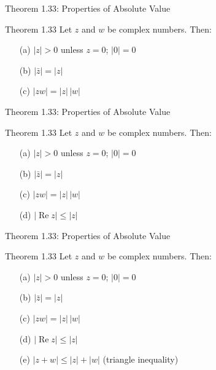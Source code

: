 \documentclass[aspectratio=169,12pt,t]{beamer}
\begin{document}
{%
\begin{frame}{Theorem 1.33: Properties of Absolute Value}
  \begin{thmblock}{Theorem 1.33}
    Let $z$ and $w$ be complex numbers. Then:
    \begin{enumerate}
      \item[(a)] $|z| > 0$ unless $z = 0$; \; $|0| = 0$
      \item[(b)] $|\bar{z}| = |z|$
      \item[(c)] $|zw| = |z|\,|w|$
    \end{enumerate}
  \end{thmblock}

\end{frame}

\begin{frame}{Theorem 1.33: Properties of Absolute Value}
  \begin{thmblock}{Theorem 1.33}
    Let $z$ and $w$ be complex numbers. Then:
    \begin{enumerate}
      \item[(a)] $|z| > 0$ unless $z = 0$; \; $|0| = 0$
      \item[(b)] $|\bar{z}| = |z|$
      \item[(c)] $|zw| = |z|\,|w|$
      \item[(d)] $|\operatorname{Re} z| \leq |z|$
    \end{enumerate}
  \end{thmblock}

\end{frame}

\begin{frame}{Theorem 1.33: Properties of Absolute Value}
  \begin{thmblock}{Theorem 1.33}
    Let $z$ and $w$ be complex numbers. Then:
    \begin{enumerate}
      \item[(a)] $|z| > 0$ unless $z = 0$; \; $|0| = 0$
      \item[(b)] $|\bar{z}| = |z|$
      \item[(c)] $|zw| = |z|\,|w|$
      \item[(d)] $|\operatorname{Re} z| \leq |z|$
      \item[(e)] $|z + w| \leq |z| + |w|$ \quad (\alert{triangle inequality})
    \end{enumerate}
  \end{thmblock}


\end{frame}}
\end{document}
